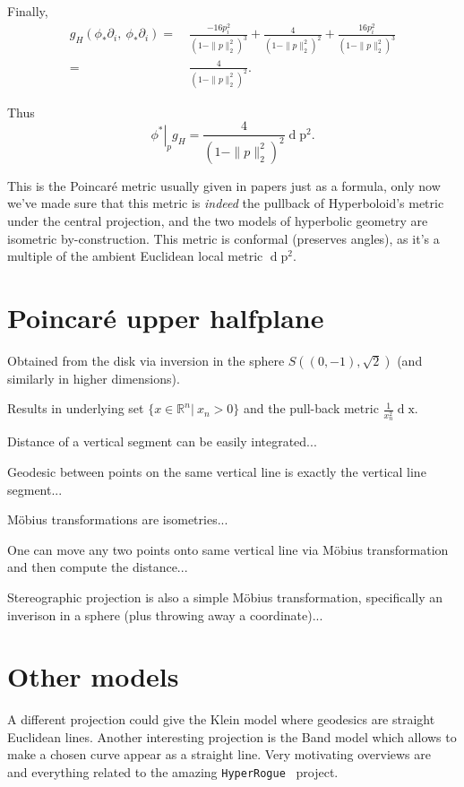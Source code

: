 Finally,
\begin{align*}
g_H(\phi_*\partial_i,~\phi_*\partial_i)
= &~\frac{-16 p_i^2}{(1 - \|p\|_2^2)^3} 
  + \frac{4}{(1-\|p\|_2^2)^2} 
  + \frac{16p_i^2}{(1 - \|p\|_2^2)^3} \\
= &~\frac{4}{(1 - \|p\|_2^2)^2}.
\end{align*}

Thus
\[ \left.\phi^*\right|_p g_H = \frac{4}{(1 - \|p\|_2^2)^2} \operatorname{d}\mathrm{p}^2. \]

This is the Poincar\'e metric usually given in papers just as a formula, only now
we've made sure that this metric is \emph{indeed} the pullback of Hyperboloid's
metric under the central projection, and the two models of hyperbolic geometry
are isometric by-construction. This metric is conformal (preserves angles), as
it's a multiple of the ambient Euclidean local metric \( \operatorname{d}\mathrm{p}^2
\).

\section{Poincar\'e upper halfplane}

Obtained from the disk via inversion in the sphere \( S((0, -1), \sqrt{2}) \)
(and similarly in higher dimensions).

Results in underlying set \( \{ x\in\mathbb{R}^n \left|~x_n > 0\right.\} \)
and the pull-back metric \( \frac{1}{x_n^2} \operatorname{d}\mathrm{x} \).

Distance of a vertical segment can be easily integrated...

Geodesic between points on the same vertical line is exactly the vertical line segment...

M\"obius transformations are isometries...

One can move any two points onto same vertical line via M\"obius transformation
and then compute the distance...

Stereographic projection is also a simple M\"obius transformation, specifically
an inverison in a sphere (plus throwing away a coordinate)...

\section{Other models}

A different projection could give the Klein model where geodesics are straight
Euclidean lines. Another interesting projection is the Band model which allows
to make a chosen curve appear as a straight line. Very motivating overviews
are~\citet{bulatovConformal} and everything related to the amazing
\texttt{HyperRogue}~\cite{hyperrogue} project.

